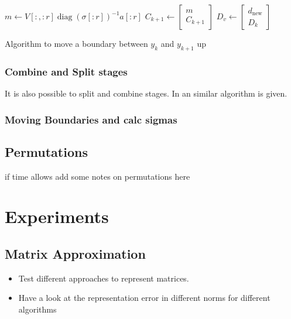 \documentclass[doctype=mastersthesis,BCOR=15mm,biblatex]{ldvbook}%
\DeclareMathOperator{\diag}{diag}
\begin{document}
\begin{algorithm}[htb]
\begin{algorithmic}
\Else
\State $m \gets V[:,:r] \diag(\sigma[:r])^{-1} a[:r]$
\State $C_{k+1} \gets \begin{bmatrix} m\\C_{k+1} \end{bmatrix}$
\EndIf
\State $D_v \gets \begin{bmatrix}
d_{\text{new}} \\D_k
\end{bmatrix}$
	\end{algorithmic}
	\caption{Algorithm to move a boundary between $y_k$ and $y_{k+1}$ up}\label{alg:move_up}
\end{algorithm}

\subsection{Combine and Split stages}
It is also possible to split and combine stages. In \cite{chandrasekaran_fast_2005} an similar algorithm is given.

\subsection{Moving Boundaries and calc sigmas}\label{subsec:move_sig}

\section{Permutations}
if time allows add some notes on permutations here



\chapter{Experiments}



\section{Matrix Approximation}
\begin{itemize}
\item Test different approaches to represent matrices.
\item Have a look at the representation error in different norms for different algorithms
\end{itemize}
\end{document}
